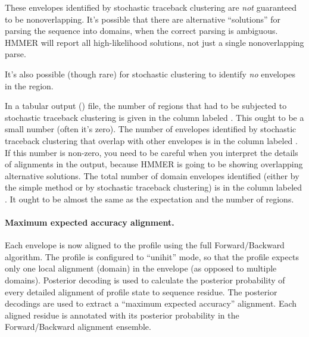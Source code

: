 These envelopes identified by stochastic traceback clustering are
\emph{not} guaranteed to be nonoverlapping. It's possible that there
are alternative ``solutions'' for parsing the sequence into domains,
when the correct parsing is ambiguous. HMMER will report all
high-likelihood solutions, not just a single nonoverlapping parse.

It's also possible (though rare) for stochastic clustering to identify
\emph{no} envelopes in the region.

In a tabular output () file, the number of regions
that had to be subjected to stochastic traceback clustering is given
in the column labeled . This ought to be a small number
(often it's zero). The number of envelopes identified by stochastic
traceback clustering that overlap with other envelopes is in the
column labeled . If this number is non-zero, you need to be
careful when you interpret the details of alignments in the output,
because HMMER is going to be showing overlapping alternative
solutions. The total number of domain envelopes identified (either by
the simple method or by stochastic traceback clustering) is in the
column labeled . It ought to be almost the same as the
expectation and the number of regions.

\paragraph{Maximum expected accuracy alignment.}
Each envelope is now aligned to the profile using the full
Forward/Backward algorithm. The profile is configured to ``unihit''
mode, so that the profile expects only one local alignment (domain) in
the envelope (as opposed to multiple domains).  Posterior decoding is
used to calculate the posterior probability of every detailed
alignment of profile state to sequence residue. The posterior
decodings are used to extract a ``maximum expected accuracy''
alignment. Each aligned residue is annotated with its posterior
probability in the Forward/Backward alignment ensemble.

